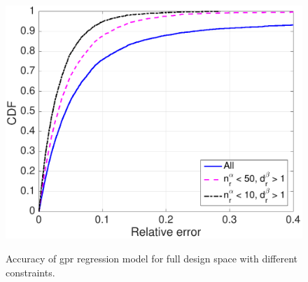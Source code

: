 
\begin{figure}[t]
    \centering
{\includegraphics[width=0.8\columnwidth]{figures/full_constraint}}
  \caption{Accuracy of \gls{gpr} regression model for full design space with different constraints. \label{fig:cdf_constraint}}
\end{figure}








